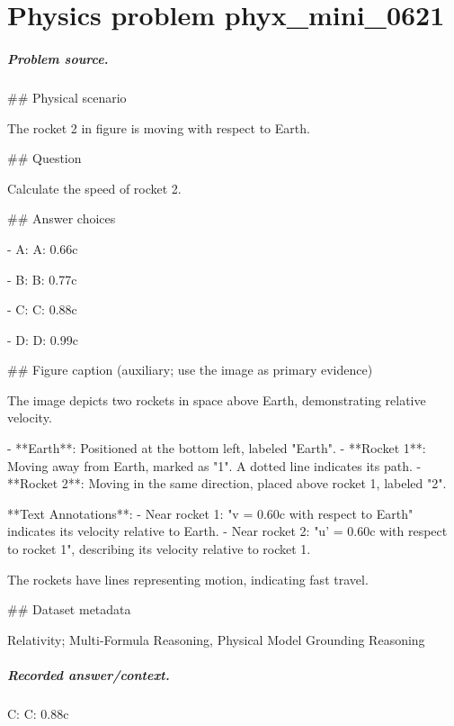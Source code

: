 
\chapter{Physics problem phyx\_mini\_0621}
\label{ch:PhyXMiniProblems_problem_phyx_mini_0621}

\paragraph{Problem source.}
\#\# Physical scenario

The rocket 2 in figure is moving with respect to Earth.

\#\# Question

Calculate the speed of rocket 2.

\#\# Answer choices

- A: A: 0.66c

- B: B: 0.77c

- C: C: 0.88c

- D: D: 0.99c

\#\# Figure caption (auxiliary; use the image as primary evidence)

The image depicts two rockets in space above Earth, demonstrating relative velocity. 

- **Earth**: Positioned at the bottom left, labeled "Earth".
- **Rocket 1**: Moving away from Earth, marked as "1". A dotted line indicates its path.
- **Rocket 2**: Moving in the same direction, placed above rocket 1, labeled "2".
  
**Text Annotations**:
- Near rocket 1: "v = 0.60c with respect to Earth" indicates its velocity relative to Earth.
- Near rocket 2: "u' = 0.60c with respect to rocket 1", describing its velocity relative to rocket 1.

The rockets have lines representing motion, indicating fast travel.

\#\# Dataset metadata

Relativity; Multi-Formula Reasoning, Physical Model Grounding Reasoning

\paragraph{Recorded answer/context.}
C: C: 0.88c


